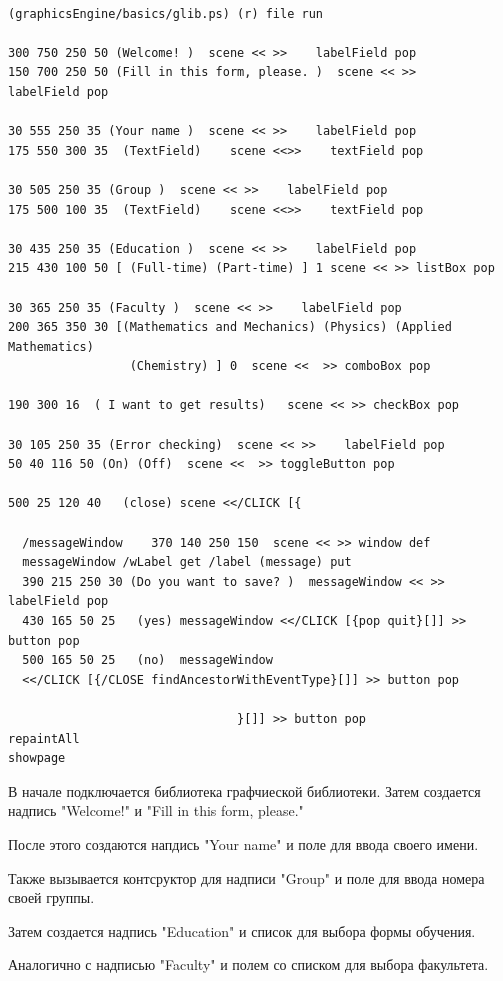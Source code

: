 \documentclass[14pt]{extarticle}
\begin{document}
\begin{lstlisting}[frame=single]  % Start your code-block

(graphicsEngine/basics/glib.ps) (r) file run

300 750 250 50 (Welcome! )  scene << >>    labelField pop
150 700 250 50 (Fill in this form, please. )  scene << >>    labelField pop

30 555 250 35 (Your name )  scene << >>    labelField pop
175 550 300 35  (TextField)    scene <<>>    textField pop

30 505 250 35 (Group )  scene << >>    labelField pop
175 500 100 35  (TextField)    scene <<>>    textField pop

30 435 250 35 (Education )  scene << >>    labelField pop
215 430 100 50 [ (Full-time) (Part-time) ] 1 scene << >> listBox pop

30 365 250 35 (Faculty )  scene << >>    labelField pop
200 365 350 30 [(Mathematics and Mechanics) (Physics) (Applied Mathematics) 
                 (Chemistry) ] 0  scene <<  >> comboBox pop

190 300 16  ( I want to get results)   scene << >> checkBox pop

30 105 250 35 (Error checking)  scene << >>    labelField pop
50 40 116 50 (On) (Off)  scene <<  >> toggleButton pop

500 25 120 40   (close) scene <</CLICK [{

  /messageWindow    370 140 250 150  scene << >> window def
  messageWindow /wLabel get /label (message) put
  390 215 250 30 (Do you want to save? )  messageWindow << >>    labelField pop
  430 165 50 25   (yes) messageWindow <</CLICK [{pop quit}[]] >>  button pop
  500 165 50 25   (no)  messageWindow 
  <</CLICK [{/CLOSE findAncestorWithEventType}[]] >> button pop 
                                
                                }[]] >> button pop
repaintAll
showpage
\end{lstlisting}
	В начале подключается библиотека графчиеской библиотеки. 
	Затем создается надпись "Welcome!" и "Fill in this form, please."
	
	После этого создаются напдись "Your name" и поле для ввода своего имени.
	
	Также вызывается контсруктор для надписи "Group" и поле для ввода номера своей группы. 
	
	Затем создается надпись "Education" и список для выбора формы обучения.
	
	Аналогично с надписью "Faculty" и полем со списком для выбора факультета.
	
\end{document}
